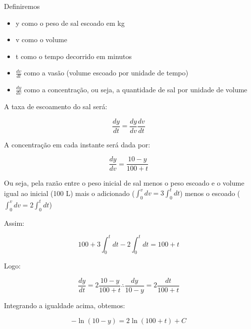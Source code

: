 \documentclass{beamer}
\begin{document}
	\begin{frame}
		Definiremos
		\begin{itemize}
			\item y como o peso de sal escoado em kg \pause
			\item v como o volume \pause
			\item t como o tempo decorrido em minutos \pause
			\item \(\frac{dv}{dt}\) como a vasão (volume escoado por unidade de tempo) \pause
			\item \(\frac{dy}{dv}\) como a concentração, ou seja, a quantidade de sal por unidade de volume \pause
		\end{itemize}
		A taxa de escoamento do sal será:
		
		\begin{displaymath}
			\frac{dy}{dt} = \frac{dy}{dv} \frac{dv}{dt}
		\end{displaymath} \pause
		
		A concentração em cada instante será dada por:
		
		\begin{displaymath}
			\frac{dy}{dv} = \frac{10 - y}{100 + t}
		\end{displaymath}
	\end{frame}

	\begin{frame}
		Ou seja, pela razão entre o peso inicial de sal menos o peso escoado e o volume igual ao inicial (100 L) mais o adicionado (\(\int^v_0 dv= 3\int^t_0 dt\)) menos o escoado (\(\int^v_0 dv= 2\int^t_0 dt\))
		
		Assim:
		
		\begin{displaymath}
			100 + 3 \int^t_0 dt - 2 \int^t_0 dt = 100 + t
		\end{displaymath} \pause
		
		Logo:
		
		\begin{displaymath}
			\frac{dy}{dt} = 2 \frac{10 - y} {100 + t} \therefore \frac{dy}{10 - y} = 2 \frac{dt}{100 + t}
		\end{displaymath} \pause
		
		Integrando a igualdade acima, obtemos:
		
		\begin{displaymath}
			-\ln(10-y) = 2 \ln(100 + t) + C
		\end{displaymath}
	\end{frame}
	
\end{document}
